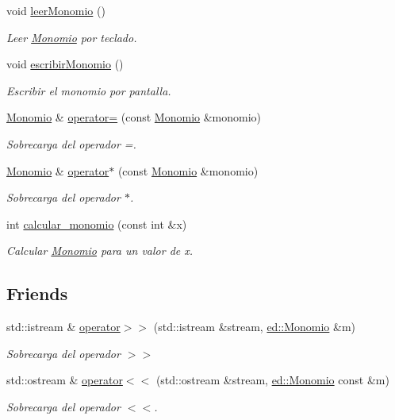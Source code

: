 \begin{DoxyCompactItemize}
void \hyperlink{classed_1_1Monomio_a1d3ec4190c5e23d93eff79ad8e9486c0}{leer\+Monomio} ()
\begin{DoxyCompactList}\small\item\em Leer \hyperlink{classed_1_1Monomio}{Monomio} por teclado. \end{DoxyCompactList}\item 
void \hyperlink{classed_1_1Monomio_a42484a47d0d877232ee7775b97b1d480}{escribir\+Monomio} ()
\begin{DoxyCompactList}\small\item\em Escribir el monomio por pantalla. \end{DoxyCompactList}\item 
\hyperlink{classed_1_1Monomio}{Monomio} \& \hyperlink{classed_1_1Monomio_a6f885cf0a8265950e32a6ba961396d98}{operator=} (const \hyperlink{classed_1_1Monomio}{Monomio} \&monomio)
\begin{DoxyCompactList}\small\item\em Sobrecarga del operador =. \end{DoxyCompactList}\item 
\hyperlink{classed_1_1Monomio}{Monomio} \& \hyperlink{classed_1_1Monomio_aa79bb8b7f4772edc68a8c3039d0c9b08}{operator$\ast$} (const \hyperlink{classed_1_1Monomio}{Monomio} \&monomio)
\begin{DoxyCompactList}\small\item\em Sobrecarga del operador $\ast$. \end{DoxyCompactList}\item 
int \hyperlink{classed_1_1Monomio_ab8aea4be110c9f196b3248111eb5962c}{calcular\+\_\+monomio} (const int \&x)
\begin{DoxyCompactList}\small\item\em Calcular \hyperlink{classed_1_1Monomio}{Monomio} para un valor de x. \end{DoxyCompactList}\end{DoxyCompactItemize}
\subsection*{Friends}
\begin{DoxyCompactItemize}
\item 
std\+::istream \& \hyperlink{classed_1_1Monomio_aa16ccd4e02c94bb3a7e8c1d56aca0ddc}{operator$>$$>$} (std\+::istream \&stream, \hyperlink{classed_1_1Monomio}{ed\+::\+Monomio} \&m)
\begin{DoxyCompactList}\small\item\em Sobrecarga del operador $>$$>$ \end{DoxyCompactList}\item 
std\+::ostream \& \hyperlink{classed_1_1Monomio_a0db976a91d041c1813e775cc5ecd070d}{operator$<$$<$} (std\+::ostream \&stream, \hyperlink{classed_1_1Monomio}{ed\+::\+Monomio} const \&m)
\begin{DoxyCompactList}\small\item\em Sobrecarga del operador $<$$<$. \end{DoxyCompactList}\end{DoxyCompactItemize}


